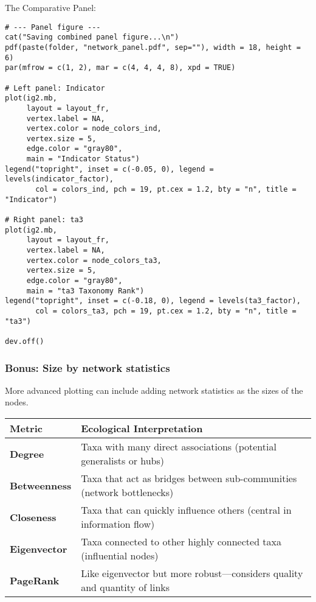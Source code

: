 \documentclass[
]{book}
\begin{document}
The Comparative Panel:

\begin{verbatim}
# --- Panel figure ---
cat("Saving combined panel figure...\n")
pdf(paste(folder, "network_panel.pdf", sep=""), width = 18, height = 6)
par(mfrow = c(1, 2), mar = c(4, 4, 4, 8), xpd = TRUE)

# Left panel: Indicator
plot(ig2.mb,
     layout = layout_fr,
     vertex.label = NA,
     vertex.color = node_colors_ind,
     vertex.size = 5,
     edge.color = "gray80",
     main = "Indicator Status")
legend("topright", inset = c(-0.05, 0), legend = levels(indicator_factor),
       col = colors_ind, pch = 19, pt.cex = 1.2, bty = "n", title = "Indicator")

# Right panel: ta3
plot(ig2.mb,
     layout = layout_fr,
     vertex.label = NA,
     vertex.color = node_colors_ta3,
     vertex.size = 5,
     edge.color = "gray80",
     main = "ta3 Taxonomy Rank")
legend("topright", inset = c(-0.18, 0), legend = levels(ta3_factor),
       col = colors_ta3, pch = 19, pt.cex = 1.2, bty = "n", title = "ta3")

dev.off()
\end{verbatim}

\subsubsection{Bonus: Size by network statistics}\label{bonus-size-by-network-statistics}

More advanced plotting can include adding network statistics as the sizes of the nodes.

\begin{longtable}[]{@{}
  >{\raggedright\arraybackslash}p{}
  >{\raggedright\arraybackslash}p{}@{}}
\toprule\noalign{}
\begin{minipage}[b]{\linewidth}\raggedright
\textbf{Metric}
\end{minipage} & \begin{minipage}[b]{\linewidth}\raggedright
\textbf{Ecological Interpretation}
\end{minipage} \\
\midrule\noalign{}
\endhead
\bottomrule\noalign{}
\endlastfoot
\textbf{Degree} & Taxa with many direct associations (potential generalists or hubs) \\
\textbf{Betweenness} & Taxa that act as bridges between sub-communities (network bottlenecks) \\
\textbf{Closeness} & Taxa that can quickly influence others (central in information flow) \\
\textbf{Eigenvector} & Taxa connected to other highly connected taxa (influential nodes) \\
\textbf{PageRank} & Like eigenvector but more robust---considers quality and quantity of links \\
\end{longtable}
\end{document}
